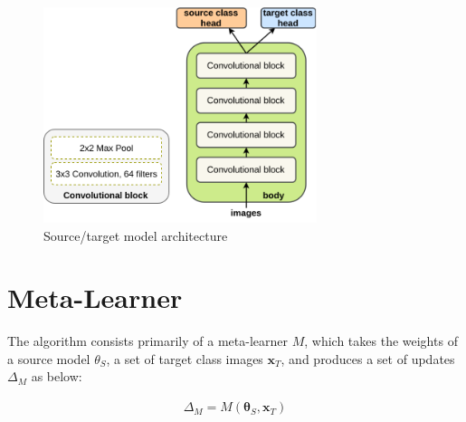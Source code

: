 \documentclass{report}
\begin{document}
\begin{figure}[h!]
	\centering
	\includegraphics[width=8cm]{model-arch}
	\caption{Source/target model architecture}
	\label{fig:model-arch:1}
\end{figure}


\section{Meta-Learner} \label{meta-learner-sub}
The algorithm consists primarily of a meta-learner $M$, which takes the weights of a source model $\theta_S$, a set of target class images $\bm{x}_T$, and produces a set of updates $\Delta_M$ as below:

	\begin{align}
	\Delta_M = M(\bm{\theta}_S, \bm{x}_T)
	\end{align}
\end{document}
